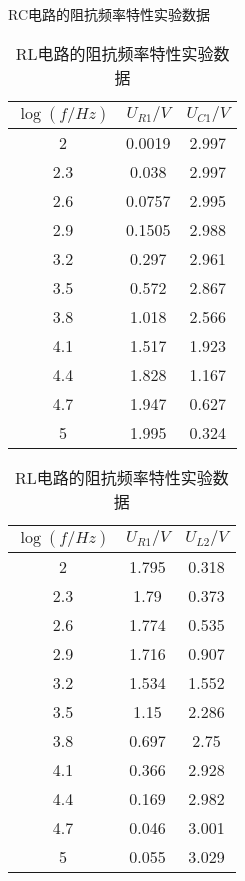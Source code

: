 \documentclass[dvipsnames, svgnames,a4paper,11pt]{article}
\begin{document}
\begin{enumerate}


				\begin{table}[htbp]
					\begin{minipage}{.5\linewidth}
					  \centering
					  \caption{RC电路的阻抗频率特性实验数据}
					  \begin{tabular}{|c|cc|} 
						  \hline
						  $\log(f/Hz)$ & $U_{R1}/V$ & $U_{C1}/V$  \\ 
						  \hline
						  2        & 0.0019  & 2.997    \\
						  2.3      & 0.038   & 2.997    \\
						  2.6      & 0.0757  & 2.995    \\
						  2.9      & 0.1505  & 2.988    \\
						  3.2      & 0.297   & 2.961    \\
						  3.5      & 0.572   & 2.867    \\
						  3.8      & 1.018   & 2.566    \\
						  4.1      & 1.517   & 1.923    \\
						  4.4      & 1.828   & 1.167    \\
						  4.7      & 1.947   & 0.627    \\
						  5        & 1.995   & 0.324    \\
						  \hline
					  \end{tabular}
					  \label{tab:tab4}
					\end{minipage}%
					\begin{minipage}{.5\linewidth}
					  \centering
					  \caption{RL电路的阻抗频率特性实验数据}
					  \begin{tabular}{|c|cc|} 
						  \hline
						  $\log(f/Hz)$ & $U_{R1}/V$ & $U_{L2}/V$  \\ 
						  \hline
						  2        & 1.795   & 0.318    \\
						  2.3      & 1.79    & 0.373    \\
						  2.6      & 1.774   & 0.535    \\
						  2.9      & 1.716   & 0.907    \\
						  3.2      & 1.534   & 1.552    \\
						  3.5      & 1.15    & 2.286    \\
						  3.8      & 0.697   & 2.75     \\
						  4.1      & 0.366   & 2.928    \\
						  4.4      & 0.169   & 2.982    \\
						  4.7      & 0.046   & 3.001    \\
						  5        & 0.055   & 3.029    \\
						  \hline
					  \end{tabular}
					  \label{tab:tab5}
					\end{minipage}
				\end{table}
				

\end{enumerate}
\end{document}
